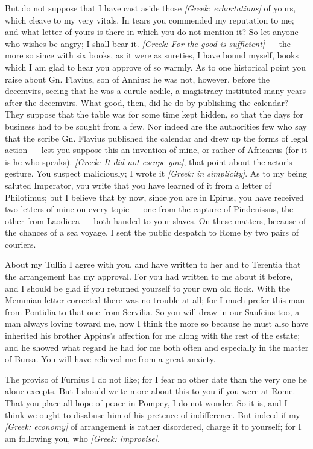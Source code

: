  But do not suppose that I have cast aside those \textit{[Greek: exhortations]} of yours, which cleave to my very vitals. In tears you commended my reputation to me; and what letter of yours is there in which you do not mention it? So let anyone who wishes be angry; I shall bear it. \textit{[Greek: For the good is sufficient]} --- the more so since with six books, as it were as sureties, I have bound myself, books which I am glad to hear you approve of so warmly. As to one historical point you raise about Gn. Flavius, son of Annius: he was not, however, before the decemvirs, seeing that he was a curule aedile, a magistracy instituted many years after the decemvirs. What good, then, did he do by publishing the calendar? They suppose that the table was for some time kept hidden, so that the days for business had to be sought from a few. Nor indeed are the authorities few who say that the scribe Gn. Flavius published the calendar and drew up the forms of legal action --- lest you suppose this an invention of mine, or rather of Africanus (for it is he who speaks). \textit{[Greek: It did not escape you]}, that point about the actor's gesture. You suspect maliciously; I wrote it \textit{[Greek: in simplicity]}. As to my being saluted Imperator, you write that you have learned of it from a letter of Philotimus; but I believe that by now, since you are in Epirus, you have received two letters of mine on every topic --- one from the capture of Pindenissus, the other from Laodicea --- both handed to your slaves. On these matters, because of the chances of a sea voyage, I sent the public despatch to Rome by two pairs of couriers.

 About my Tullia I agree with you, and have written to her and to Terentia that the arrangement has my approval. For you had written to me about it before, and I should be glad if you returned yourself to your own old flock. With the Memmian letter corrected there was no trouble at all; for I much prefer this man from Pontidia to that one from Servilia. So you will draw in our Saufeius too, a man always loving toward me, now I think the more so because he must also have inherited his brother Appius's affection for me along with the rest of the estate; and he showed what regard he had for me both often and especially in the matter of Bursa. You will have relieved me from a great anxiety.

 The proviso of Furnius I do not like; for I fear no other date than the very one he alone excepts. But I should write more about this to you if you were at Rome. That you place all hope of peace in Pompey, I do not wonder. So it is, and I think we ought to disabuse him of his pretence of indifference. But indeed if my \textit{[Greek: economy]} of arrangement is rather disordered, charge it to yourself; for I am following you, who \textit{[Greek: improvise]}.

